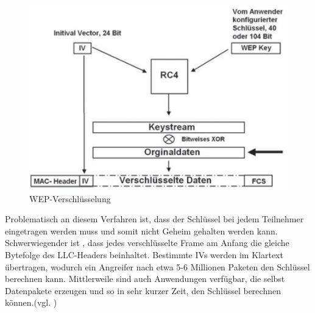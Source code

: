 \begin{figure} [htb]
\begin{centering}
\includegraphics{Bilder/Kapitel2/wep_funktionsweise.jpg}
\caption[WEP-Verschlüsselung]{WEP-Verschlüsselung \cite{SWB-430171331}}
\label{wep_funktionsweise}
\end{centering}
\end{figure}

Problematisch an diesem Verfahren ist, dass der Schlüssel bei jedem Teilnehmer eingetragen werden muss und somit nicht Geheim gehalten werden kann. Schwerwiegender ist , dass jedes verschlüsselte Frame am Anfang die gleiche Bytefolge des \ac{LLC}-Headers beinhaltet. Bestimmte \acp{IV} werden im Klartext übertragen, wodurch ein Angreifer nach etwa 5-6 Millionen Paketen den Schlüssel berechnen kann. Mittlerweile sind auch Anwendungen verfügbar, die selbst Datenpakete erzeugen und so in sehr kurzer Zeit, den Schlüssel berechnen können.(vgl. \cite{SWB-430171331})
